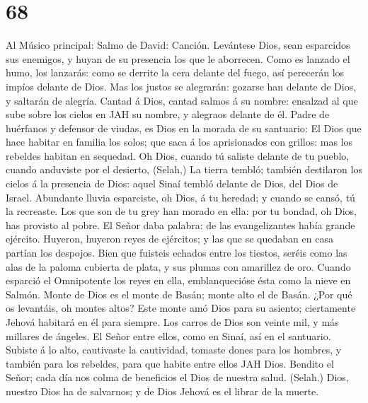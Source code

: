 \hypertarget{section-67}{%
\section{68}\label{section-67}}

 Al Músico principal: Salmo de David: Canción. Levántese
Dios, sean esparcidos sus enemigos, y huyan de su presencia los que le
aborrecen.  Como es lanzado el humo, los lanzarás: como se
derrite la cera delante del fuego, así perecerán los impíos delante de
Dios.  Mas los justos se alegrarán: gozarse han delante de
Dios, y saltarán de alegría.  Cantad á Dios, cantad salmos
á su nombre: ensalzad al que sube sobre los cielos en JAH su nombre, y
alegraos delante de él.  Padre de huérfanos y defensor de
viudas, es Dios en la morada de su santuario:  El Dios que
hace habitar en familia los solos; que saca á los aprisionados con
grillos: mas los rebeldes habitan en sequedad.  Oh Dios,
cuando tú saliste delante de tu pueblo, cuando anduviste por el
desierto, (Selah,)  La tierra tembló; también destilaron
los cielos á la presencia de Dios: aquel Sinaí tembló delante de Dios,
del Dios de Israel.  Abundante lluvia esparciste, oh Dios,
á tu heredad; y cuando se cansó, tú la recreaste.  Los
que son de tu grey han morado en ella: por tu bondad, oh Dios, has
provisto al pobre.  El Señor daba palabra: de las
evangelizantes había grande ejército.  Huyeron, huyeron
reyes de ejércitos; y las que se quedaban en casa partían los despojos.
 Bien que fuisteis echados entre los tiestos, seréis como
las alas de la paloma cubierta de plata, y sus plumas con amarillez de
oro.  Cuando esparció el Omnipotente los reyes en ella,
emblanquecióse ésta como la nieve en Salmón.  Monte de
Dios es el monte de Basán; monte alto el de Basán.  ¿Por
qué os levantáis, oh montes altos? Este monte amó Dios para su asiento;
ciertamente Jehová habitará en él para siempre.  Los
carros de Dios son veinte mil, y más millares de ángeles. El Señor entre
ellos, como en Sinaí, así en el santuario.  Subiste á lo
alto, cautivaste la cautividad, tomaste dones para los hombres, y
también para los rebeldes, para que habite entre ellos JAH Dios.
 Bendito el Señor; cada día nos colma de beneficios el
Dios de nuestra salud. (Selah.)  Dios, nuestro Dios ha de
salvarnos; y de Dios Jehová es el librar de la muerte. 
